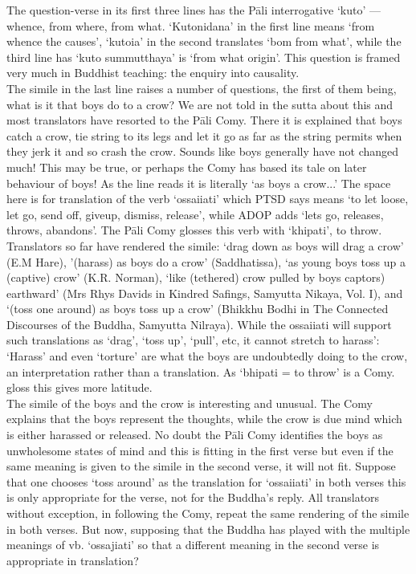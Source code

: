 The question-verse in its first three lines has the P\=ali interrogative `kuto' — whence, from where, from what. `Kutonidana' in the ﬁrst line means `from whence the causes', `kutoia' in the second translates `bom from what', while the third line has `kuto summutthaya' is `from what origin'. This question is framed very much in Buddhist teaching: the enquiry into causality.\\
 
The simile in the last line raises a number of questions, the first of them being, what is it that boys do to a crow? We are not told in the sutta about this and most translators have resorted to the P\=ali Comy. There it is explained that boys catch a crow, tie string to its legs and let it go as far as the string permits when they jerk it and so crash the crow. Sounds like boys generally have not changed much! This may be true, or perhaps the Comy has based its tale on later behaviour of boys! As the line reads it is literally `as boys a crow...' The space here is for translation of the verb `ossaiiati' which PTSD says means `to let loose, let go, send off, giveup, dismiss, release', while ADOP adds `lets go, releases, throws, abandons'. The P\=ali Comy glosses this verb with `khipati', to throw.\\
  
Translators so far have rendered the simile: `drag down as boys will drag a crow' (E.M Hare), '(harass) as boys do a crow' (Saddhatissa), `as young boys toss up a (captive) crow' (K.R. Norman), `like (tethered) crow pulled by boys captors) earthward' (Mrs Rhys Davids in Kindred Saﬁngs, Samyutta Nikaya, Vol. I), and `(toss one around) as boys toss up a crow' (Bhikkhu Bodhi in The Connected Discourses of the Buddha, Samyutta Nilraya). While the  ossaiiati will support such translations as `drag', `toss up', `pull', etc, it cannot stretch to harass': `Harass' and even `torture' are what the boys are undoubtedly doing to the crow, an interpretation rather than a translation. As `bhipati = to throw' is a Comy. gloss this gives more latitude.\\

 The simile of the boys and the crow is interesting and unusual. The Comy explains that the boys represent the thoughts, while the crow is due mind which is either harassed or released. No doubt the P\=ali Comy identifies the boys as unwholesome states of mind and this is fitting in the first verse but even if the same meaning is given to the simile in the second verse, it will not ﬁt. Suppose that one chooses `toss around' as the translation for `ossaiiati' in both verses this is only appropriate for the verse, not for the Buddha's reply. All translators without exception, in following the Comy, repeat the same rendering of the simile in both verses. But now, supposing that the Buddha has played with the multiple meanings of vb. `ossajiati' so that a different meaning in the second verse is appropriate in translation?\\
 
